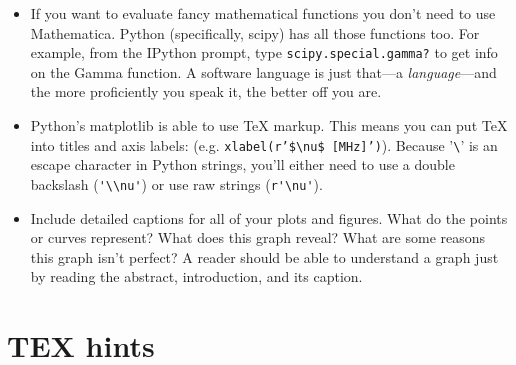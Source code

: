 \documentclass[12pt,preprint]{aastex}
\begin{document}
\begin{itemize}
\item If you want to evaluate fancy mathematical functions you don't
need to use Mathematica.  Python (specifically, scipy) has all those functions too.  For example,
from the IPython prompt, type \verb$scipy.special.gamma?$ to get info on the Gamma
function.  A software language is just that---a {\it language}---and the
more proficiently you speak it, the better off you are.  

\item Python's matplotlib is able to use TeX markup.  This means you can put TeX into
titles and axis labels: (e.g. {\tt xlabel(r'\$\verb$\$nu\$ [MHz]')}).  Because '\verb$\$'
is an escape character in Python strings, you'll either need to use a double backslash (\verb$'\\nu'$)
or use raw strings (\verb$r'\nu'$).

\item Include detailed captions for all of your plots and figures. What do the points or curves represent? What does this graph reveal? What are some reasons this graph isn't perfect? A reader should be able to understand a graph just by reading the abstract, introduction, and its caption.

\end{itemize}

\section{TEX hints}
\end{document}
